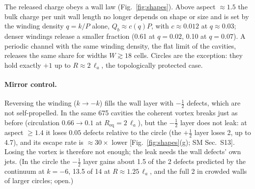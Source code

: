 \documentclass[aps,prl,twocolumn,superscriptaddress,amsmath,amssymb,reprint]{revtex4-2}
\newcommand{\half}{\tfrac12}
\newcommand{\la}{\ell_a}
\begin{document}
The released charge obeys a wall law (Fig.~\ref{fig:shapes}). Above aspect $\approx1.5$ the bulk charge per unit wall length no longer depends on shape or size
and is set by the winding density $q=k/P$ alone, $Q_b\approx c(q)P$, with $c\approx0.012$ at $q\approx0.03$; denser windings release a smaller fraction
(0.61 at $q=0.02$, 0.10 at $q=0.07$). A periodic channel with the same winding density, the flat limit of the cavities, releases the same share for widths $W\gtrsim18$ cells. Circles are the
exception: they hold exactly $+1$ up to $R\approx2\,\la$, the topologically protected case.

\paragraph*{Mirror control.} Reversing the winding ($k\to-k$) fills the wall layer with $-\half$ defects, which are not self-propelled. In the same 675 cavities the
coherent vortex breaks just as before (circulation $0.66\to0.1$ at $R_\mathrm{eq}=2\,\la$), but the $-\half$ layer does not leak: at aspect $\geq1.4$ it loses
$0.05$ defects relative to the circle (the $+\half$ layer loses 2, up to 4.7), and its escape rate is $\approx30\times$ lower [Fig.~\ref{fig:shapes}(g); SM Sec.~S13].
Losing the vortex is therefore not enough; the leak needs the wall defects' own jets. (In the circle the $-\half$ layer gains about 1.5 of the 2 defects predicted
by the continuum at $k=-6$, 13.5 of 14 at $R\approx1.25\,\la$, and the full 2 in crowded walls of larger circles; open.)

\end{document}
